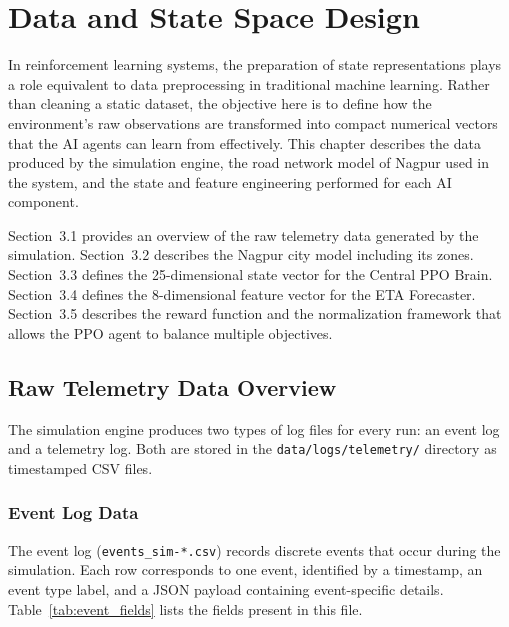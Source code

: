 \chapter{Data and State Space Design}

In reinforcement learning systems, the preparation of state representations plays
a role equivalent to data preprocessing in traditional machine learning. Rather
than cleaning a static dataset, the objective here is to define how the
environment's raw observations are transformed into compact numerical vectors that
the AI agents can learn from effectively. This chapter describes the data produced
by the simulation engine, the road network model of Nagpur used in the system, and
the state and feature engineering performed for each AI component.

Section~3.1 provides an overview of the raw telemetry data generated by the
simulation. Section~3.2 describes the Nagpur city model including its zones.
Section~3.3 defines the 25-dimensional state vector for the Central PPO Brain.
Section~3.4 defines the 8-dimensional feature vector for the ETA Forecaster.
Section~3.5 describes the reward function and the normalization framework that
allows the PPO agent to balance multiple objectives.

\section{Raw Telemetry Data Overview}

The simulation engine produces two types of log files for every run: an event log
and a telemetry log. Both are stored in the \texttt{data/logs/telemetry/} directory
as timestamped CSV files.

\subsection{Event Log Data}

The event log (\texttt{events\_sim-*.csv}) records discrete events that occur
during the simulation. Each row corresponds to one event, identified by a
timestamp, an event type label, and a JSON payload containing event-specific
details. Table~\ref{tab:event_fields} lists the fields present in this file.

